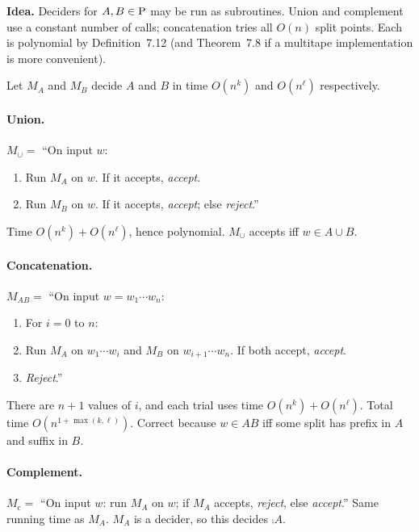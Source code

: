\begin{soln}
\textbf{Idea.} Deciders for $A,B\in\mathrm{P}$ may be run as subroutines. Union and complement use a constant number of calls; concatenation tries all $O(n)$ split points. Each is polynomial by Definition~7.12 (and Theorem~7.8 if a multitape implementation is more convenient).

Let $M_A$ and $M_B$ decide $A$ and $B$ in time $O(n^k)$ and $O(n^\ell)$ respectively.

\paragraph{Union.}
$M_\cup=$ ``On input $w$:
\begin{enumerate}
\item Run $M_A$ on $w$. If it accepts, \emph{accept}.
\item Run $M_B$ on $w$. If it accepts, \emph{accept}; else \emph{reject}.''
\end{enumerate}
Time $O(n^k)+O(n^\ell)$, hence polynomial. $M_\cup$ accepts iff $w\in A\cup B$.

\paragraph{Concatenation.}
$M_{AB}=$ ``On input $w=w_1\cdots w_n$:
\begin{enumerate}
\item For $i=0$ to $n$:
\item \quad Run $M_A$ on $w_1\cdots w_i$ and $M_B$ on $w_{i+1}\cdots w_n$. If both accept, \emph{accept}.
\item \emph{Reject}.''
\end{enumerate}
There are $n+1$ values of $i$, and each trial uses time $O(n^k)+O(n^\ell)$. Total time $O(n^{1+\max(k,\ell)})$. Correct because $w\in AB$ iff some split has prefix in $A$ and suffix in $B$.

\paragraph{Complement.}
$M_{\mathrm{c}}=$ ``On input $w$: run $M_A$ on $w$; if $M_A$ accepts, \emph{reject}, else \emph{accept}.''
Same running time as $M_A$. $M_A$ is a decider, so this decides $\comp{A}$.
\end{soln}

